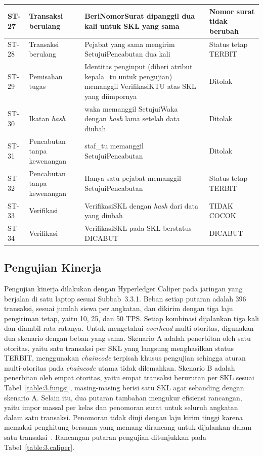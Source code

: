 \begin{longtable}{|>{\raggedright\arraybackslash}p{}|>{\raggedright\arraybackslash}p{}|>{\raggedright\arraybackslash}p{}|>{\raggedright\arraybackslash}p{}|}
    ST-27 & Transaksi berulang & BeriNomorSurat dipanggil dua kali untuk SKL yang sama & Nomor surat tidak berubah \\ \hline
    ST-28 & Transaksi berulang & Pejabat yang sama mengirim SetujuiPencabutan dua kali & Status tetap TERBIT \\ \hline
    ST-29 & Pemisahan tugas & Identitas penginput (diberi atribut kepala\_tu untuk pengujian) memanggil VerifikasiKTU atas SKL yang diimpornya & Ditolak \\ \hline
    ST-30 & Ikatan \textit{hash} & waka memanggil SetujuiWaka dengan \textit{hash} lama setelah data diubah & Ditolak \\ \hline
    ST-31 & Pencabutan tanpa kewenangan & staf\_tu memanggil SetujuiPencabutan & Ditolak \\ \hline
    ST-32 & Pencabutan tanpa kewenangan & Hanya satu pejabat memanggil SetujuiPencabutan & Status tetap TERBIT \\ \hline
    ST-33 & Verifikasi & VerifikasiSKL dengan \textit{hash} dari data yang diubah & TIDAK COCOK \\ \hline
    ST-34 & Verifikasi & VerifikasiSKL pada SKL berstatus DICABUT & DICABUT \\ \hline
\end{longtable}
\endgroup

\subsection{Pengujian Kinerja}
Pengujian kinerja dilakukan dengan Hyperledger Caliper pada jaringan yang berjalan di satu laptop sesuai Subbab~3.3.1. Beban setiap putaran adalah 396 transaksi, sesuai jumlah siswa per angkatan, dan dikirim dengan tiga laju pengiriman tetap, yaitu 10, 25, dan 50 TPS. Setiap kombinasi dijalankan tiga kali dan diambil rata-ratanya. Untuk mengetahui \textit{overhead} multi-otoritas, digunakan dua skenario dengan beban yang sama. Skenario A adalah penerbitan oleh satu otoritas, yaitu satu transaksi per SKL yang langsung menghasilkan status TERBIT, menggunakan \textit{chaincode} terpisah khusus pengujian sehingga aturan multi-otoritas pada \textit{chaincode} utama tidak dilemahkan. Skenario B adalah penerbitan oleh empat otoritas, yaitu empat transaksi berurutan per SKL sesuai Tabel~\ref{table:3.fungsi}, masing-masing berisi satu SKL agar sebanding dengan skenario A. Selain itu, dua putaran tambahan mengukur efisiensi rancangan, yaitu impor massal per kelas dan penomoran surat untuk seluruh angkatan dalam satu transaksi. Penomoran tidak diuji dengan laju kirim tinggi karena memakai penghitung bersama yang memang dirancang untuk dijalankan dalam satu transaksi~\cite{FabricRWSet}. Rancangan putaran pengujian ditunjukkan pada Tabel~\ref{table:3.caliper}.

